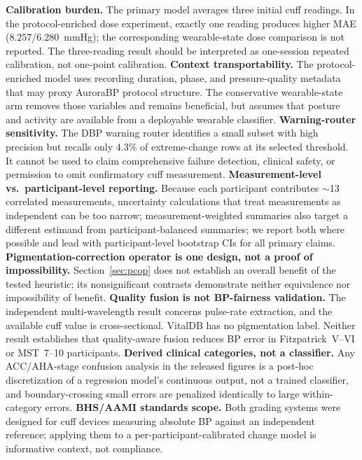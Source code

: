 \documentclass[journal]{IEEEtran}
\begin{document}
\textbf{Calibration burden.} The primary model averages three initial cuff readings. In the protocol-enriched dose experiment, exactly one reading produces higher MAE ($8.257$/$6.280$~mmHg); the corresponding wearable-state dose comparison is not reported. The three-reading result should be interpreted as one-session repeated calibration, not one-point calibration.
\textbf{Context transportability.} The protocol-enriched model uses recording duration, phase, and pressure-quality metadata that may proxy AuroraBP protocol structure. The conservative wearable-state arm removes those variables and remains beneficial, but assumes that posture and activity are available from a deployable wearable classifier.
\textbf{Warning-router sensitivity.} The DBP warning router identifies a small subset with high precision but recalls only $4.3\%$ of extreme-change rows at its selected threshold. It cannot be used to claim comprehensive failure detection, clinical safety, or permission to omit confirmatory cuff measurement.
\textbf{Measurement-level vs.\ participant-level reporting.} Because each participant contributes $\sim$13 correlated measurements, uncertainty calculations that treat measurements as independent can be too narrow; measurement-weighted summaries also target a different estimand from participant-balanced summaries; we report both where possible and lead with participant-level bootstrap CIs for all primary claims.
\textbf{Pigmentation-correction operator is one design, not a proof of impossibility.} Section~\ref{sec:pcop} does not establish an overall benefit of the tested heuristic; its nonsignificant contrasts demonstrate neither equivalence nor impossibility of benefit.
\textbf{Quality fusion is not BP-fairness validation.} The independent multi-wavelength result concerns pulse-rate extraction, and the available cuff value is cross-sectional. VitalDB has no pigmentation label. Neither result establishes that quality-aware fusion reduces BP error in Fitzpatrick~V--VI or MST~7--10 participants.
\textbf{Derived clinical categories, not a classifier.} Any ACC/AHA-stage confusion analysis in the released figures is a post-hoc discretization of a regression model's continuous output, not a trained classifier, and boundary-crossing small errors are penalized identically to large within-category errors.
\textbf{BHS/AAMI standards scope.} Both grading systems were designed for cuff devices measuring absolute BP against an independent reference; applying them to a per-participant-calibrated change model is informative context, not compliance.
\end{document}
